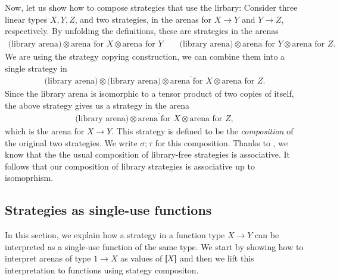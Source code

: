 Now, let us show how to compose strategies that use the lirbary:
Consider three linear types $X, Y, Z$, and two strategies, in the arenas for $X \to Y$ and $Y \to Z$, respectively. 
By unfolding the definitions, these are strategies in the arenas 
\begin{align*}
\text{(library arena)} \otimes \overline{\text{arena for $X$}} \otimes \text{arena for $Y$} 
\qquad 
\text{(library arena)} \otimes \overline{\text{arena for $Y$}} \otimes \text{arena for $Z$}.
\end{align*}
We are using the strategy copying construction, we can combine them into a single  strategy in 
\begin{align*}
\text{(library arena)} \otimes  \text{(library arena)}\otimes \overline{\text{arena for $X$}} \otimes \text{arena for $Z$}.
\end{align*}
Since the library arena is isomorphic to a tensor product of two copies of itself, the above strategy gives us a strategy in the arena 
\begin{align*}
    \text{(library arena)} \otimes   \overline{\text{arena for $X$}} \otimes \text{arena for $Z$},
    \end{align*}
which is the arena for $X \to Y$. This strategy is defined to be the \emph{composition} of the original two  strategies. We write $\sigma; \tau$ for this composition. Thanks to \cite[Proposition~1.2]{abramsky2013semantics}, we know that the the usual
composition of library-free strategies is associative. It follows that our composition of library strategies is associative 
up to isomoprhism. 


\subsection{Strategies as single-use functions}
In this section, we explain how a strategy in a function type $X \to Y$ can be interpreted as a single-use function of the same type.
We start by showing how to interpret arenas of type $1 \to X$ as values of $[\!\![X]\!\!]$ and then we lift this interpretation to functions 
using stategy compositon. 




